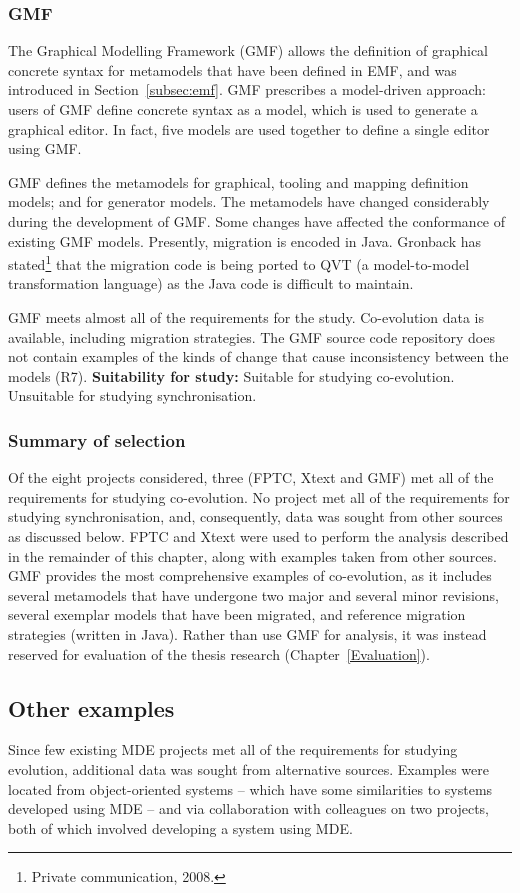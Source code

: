 \subsubsection{GMF}
The Graphical Modelling Framework (GMF) \cite{gronback09emp} allows the definition of graphical concrete syntax for metamodels that have been defined in EMF, and was introduced in Section~\ref{subsec:emf}. GMF prescribes a model-driven approach: users of GMF define concrete syntax as a model, which is used to generate a graphical editor. In fact, five models are used together to define a single editor using GMF.

GMF defines the metamodels for graphical, tooling and mapping definition models; and for generator models. The metamodels have changed considerably during the development of GMF. Some changes have affected the conformance of existing GMF models. Presently, migration is encoded in Java. Gronback has stated\footnote{Private communication, 2008.} that the migration code is being ported to QVT (a model-to-model transformation language) as the Java code is difficult to maintain.

GMF meets almost all of the requirements for the study. Co-evolution data is available, including migration strategies. The GMF source code repository does not contain examples of the kinds of change that cause inconsistency between the models (R7). \textbf{Suitability for study:} Suitable for studying co-evolution. Unsuitable for studying synchronisation.

\subsubsection{Summary of selection}
Of the eight projects considered, three (FPTC, Xtext and GMF) met all of the requirements for studying co-evolution. No project met all of the requirements for studying synchronisation, and, consequently, data was sought from other sources as discussed below. FPTC and Xtext were used to perform the analysis described in the remainder of this chapter, along with examples taken from other sources. GMF provides the most comprehensive examples of co-evolution, as it includes several metamodels that have undergone two major and several minor revisions, several exemplar models that have been migrated, and reference migration strategies (written in Java). Rather than use GMF for analysis, it was instead reserved for evaluation of the thesis research (Chapter~\ref{Evaluation}).

\subsection{Other examples}
\label{sec:other_examples}
Since few existing MDE projects met all of the requirements for studying evolution, additional data was sought from alternative sources. Examples were located from object-oriented systems -- which have some similarities to systems developed using MDE -- and via collaboration with colleagues on two projects, both of which involved developing a system using MDE.

